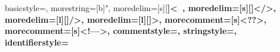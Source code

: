 \usepackage{titling}
\usepackage{natbib}
\usepackage{har2nat}
\usepackage{underscore}
\usepackage{titlesec}
\usepackage{graphicx}
\usepackage{mathtools}
\usepackage{listings}
\usepackage{float}
\usepackage[svgnames]{xcolor}
\usepackage[export]{adjustbox}
\usepackage[top=1in, bottom=1in, left=1.5in, right=1in]{geometry}
\usepackage[font=small]{caption}




\graphicspath{{media/}}

{
  basicstyle=\ttfamily\footnotesize,
  morestring=[b]",
  moredelim=[s][\bfseries\color{Maroon}]{<}{\ },
  moredelim=[s][\bfseries\color{Maroon}]{</}{>},
  moredelim=[l][\bfseries\color{Maroon}]{/>},
  moredelim=[l][\bfseries\color{Maroon}]{>},
  morecomment=[s]{<?}{?>},
  morecomment=[s]{<!--}{-->},
  commentstyle=\color{DarkOliveGreen},
  stringstyle=\color{blue},
  identifierstyle=\color{red}
}